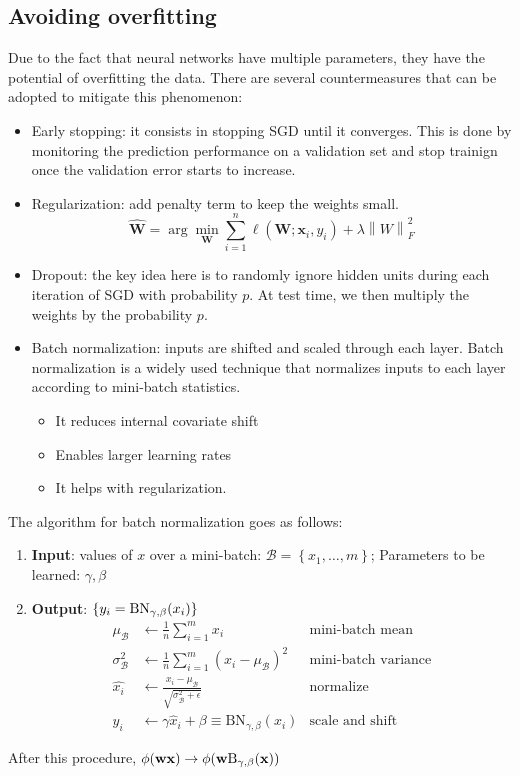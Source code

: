 \documentclass[a4paper,10pt,twoside]{article}
\newcommand\norm[1]{\left\lVert#1\right\rVert}
\begin{document}
\subsection{Avoiding overfitting}

Due to the fact that neural networks have multiple parameters, they have the potential of overfitting the data. There are several countermeasures that can be adopted to mitigate this phenomenon:
\begin{itemize}
    \item Early stopping: it consists in stopping SGD until it converges. This is done by monitoring the prediction performance on a validation set and stop trainign once the validation error starts to increase. 
    \item Regularization: add penalty term to keep the weights small. 
    \begin{equation*}
        \hat{\mathbf{W}}=\arg\min_{\mathbf{W}}\sum_{i=1}^{n}\ell(\mathbf{W};\mathbf{x}_i,y_i)+\lambda\norm{W}_{F}^2
    \end{equation*}
    \item Dropout: the key idea here is to randomly ignore hidden units during each iteration of SGD with probability $p$. At test time, we then multiply the weights by the probability $p$.
    \item Batch normalization: inputs are shifted and scaled through each layer. Batch normalization is a widely used technique that normalizes inputs to each layer according to mini-batch statistics.
    \begin{itemize}
        \item It reduces internal covariate shift
        \item Enables larger learning rates
        \item It helps with regularization.
    \end{itemize}
\end{itemize}

The algorithm for batch normalization goes as follows:
\begin{enumerate}
    \item \textbf{Input}: values of $x$ over a mini-batch: $\mathcal{B}=\left\{x_1,\ldots,m\right\}$; Parameters to be learned: $\gamma,\beta$
    \item \textbf{Output}: $\left\{y_i=\textnormal{BN}_{\gamma,\beta}(x_i)\right\}$
    \begin{align*}
        \mu_{\mathcal{B}}&\leftarrow\frac{1}{n}\sum_{i=1}^{m}x_i &\text{mini-batch mean}\\
        \sigma_{\mathcal{B}}^2&\leftarrow\frac{1}{n}\sum_{i=1}^{m}(x_i-\mu_{\mathcal{B}})^2&\text{mini-batch variance}\\
        \hat{x_i}&\leftarrow \frac{x_i-\mu_{\mathcal{B}}}{\sqrt{\sigma_{\mathcal{B}}^2+\epsilon}}&\text{normalize}\\
        y_i&\leftarrow \gamma\hat{x}_i+\beta\equiv\text{BN}_{\gamma, \beta}(x_i)&\text{scale and shift}
    \end{align*}
\end{enumerate}
After this procedure, $\phi(\mathbf{w}\mathbf{x})\rightarrow\phi(\mathbf{w}\textnormal{B}_{\gamma,\beta}(\mathbf{x}))$
\end{document}
